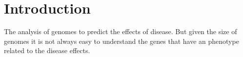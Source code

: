 \section{Introduction}
\label{sec:intro}
The analysis of genomes to predict the effects of disease. But given the size of genomes it is not always easy to understand the genes that have an phenotype related to the disease effects.


